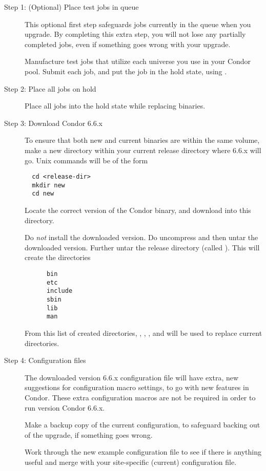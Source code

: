 \begin{description}
\item[Step 1:  (Optional) Place test jobs in queue]
This optional first step safeguards jobs currently in the
queue when you upgrade.
By completing this extra step, you will not lose any
partially completed jobs, even if something goes wrong with
your upgrade.

Manufacture test jobs that utilize each universe you use in
your Condor pool.
Submit each job, and put the job in the hold state, 
using .

\item[Step 2:  Place all jobs on hold]
Place all jobs into the hold state while replacing binaries.


\item[Step 3:  Download Condor 6.6.x]
To ensure that both new and current binaries are within
the same volume,
make a new directory within your current release
directory where 6.6.x 
will go. 
Unix commands will be of the form
\begin{verbatim}
  cd <release-dir>
  mkdir new
  cd new
\end{verbatim}

Locate the correct version of the Condor
binary, and download into this  directory.

Do \emph{not} install the downloaded version.
Do uncompress and then untar the downloaded version.
Further untar the release directory (called ).
This will create the directories
\begin{verbatim}
      bin
      etc
      include
      sbin
      lib
      man
\end{verbatim}
From this list of created directories, 
,
,
, and
 will be used to replace current directories.

\item[Step 4:  Configuration files]
The downloaded version 6.6.x
configuration file will have extra, new suggestions
for configuration macro settings,
to go with new features in Condor.
These extra configuration macros
are not be required in order to run version Condor 6.6.x.

Make a backup copy of the current configuration, to
safeguard backing out of the upgrade, if something goes wrong.

Work through the new
example configuration file to see if there
is anything useful and merge with your site-specific (current)
configuration file.


\end{description}
